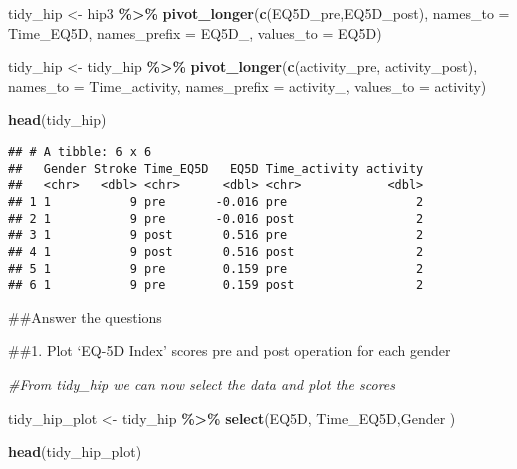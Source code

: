 \documentclass[
]{article}
\newenvironment{Shaded}{\begin{snugshade}}{\end{snugshade}}
\newcommand{\AttributeTok}[1]{\textcolor[rgb]{0.13,0.29,0.53}{#1}}
\newcommand{\CommentTok}[1]{\textcolor[rgb]{0.56,0.35,0.01}{\textit{#1}}}
\newcommand{\FunctionTok}[1]{\textcolor[rgb]{0.13,0.29,0.53}{\textbf{#1}}}
\newcommand{\NormalTok}[1]{#1}
\newcommand{\OtherTok}[1]{\textcolor[rgb]{0.56,0.35,0.01}{#1}}
\newcommand{\SpecialCharTok}[1]{\textcolor[rgb]{0.81,0.36,0.00}{\textbf{#1}}}
\newcommand{\StringTok}[1]{\textcolor[rgb]{0.31,0.60,0.02}{#1}}
\begin{document}
\begin{Shaded}
\begin{Highlighting}[]
\NormalTok{tidy\_hip }\OtherTok{\textless{}{-}}\NormalTok{ hip3 }\SpecialCharTok{\%\textgreater{}\%} 
  \FunctionTok{pivot\_longer}\NormalTok{(}\FunctionTok{c}\NormalTok{(EQ5D\_pre,EQ5D\_post),}
               \AttributeTok{names\_to =} \StringTok{\textquotesingle{}Time\_EQ5D\textquotesingle{}}\NormalTok{,}
               \AttributeTok{names\_prefix =} \StringTok{\textquotesingle{}EQ5D\_\textquotesingle{}}\NormalTok{,}
               \AttributeTok{values\_to =} \StringTok{\textquotesingle{}EQ5D\textquotesingle{}}\NormalTok{)}


\NormalTok{tidy\_hip }\OtherTok{\textless{}{-}}\NormalTok{ tidy\_hip }\SpecialCharTok{\%\textgreater{}\%} 
  \FunctionTok{pivot\_longer}\NormalTok{(}\FunctionTok{c}\NormalTok{(activity\_pre, activity\_post),}
               \AttributeTok{names\_to =} \StringTok{\textquotesingle{}Time\_activity\textquotesingle{}}\NormalTok{,}
               \AttributeTok{names\_prefix =} \StringTok{\textquotesingle{}activity\_\textquotesingle{}}\NormalTok{,}
               \AttributeTok{values\_to =} \StringTok{\textquotesingle{}activity\textquotesingle{}}\NormalTok{)}


\FunctionTok{head}\NormalTok{(tidy\_hip)}
\end{Highlighting}
\end{Shaded}

\begin{verbatim}
## # A tibble: 6 x 6
##   Gender Stroke Time_EQ5D   EQ5D Time_activity activity
##   <chr>   <dbl> <chr>      <dbl> <chr>            <dbl>
## 1 1           9 pre       -0.016 pre                  2
## 2 1           9 pre       -0.016 post                 2
## 3 1           9 post       0.516 pre                  2
## 4 1           9 post       0.516 post                 2
## 5 1           9 pre        0.159 pre                  2
## 6 1           9 pre        0.159 post                 2
\end{verbatim}

\#\#Answer the questions

\#\#1. Plot `EQ-5D Index' scores pre and post operation for each gender

\begin{Shaded}
\begin{Highlighting}[]
\CommentTok{\#From tidy\_hip we can now select the data and plot the scores}

\NormalTok{tidy\_hip\_plot }\OtherTok{\textless{}{-}}\NormalTok{ tidy\_hip }\SpecialCharTok{\%\textgreater{}\%} 
  \FunctionTok{select}\NormalTok{(EQ5D, Time\_EQ5D,Gender}
\NormalTok{         )}

\FunctionTok{head}\NormalTok{(tidy\_hip\_plot)}
\end{Highlighting}
\end{Shaded}
\end{document}
